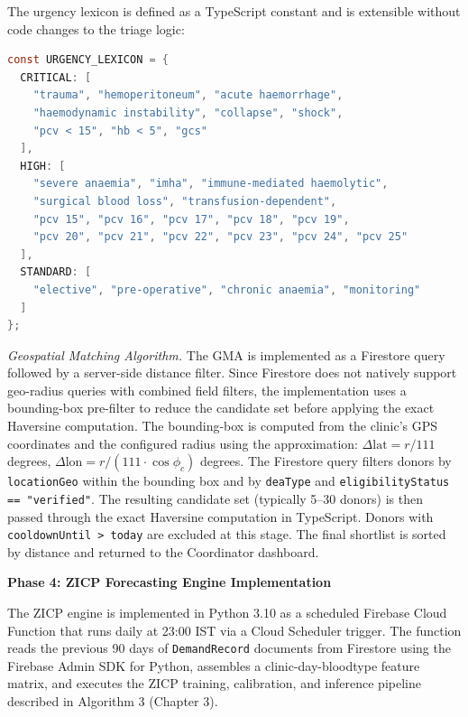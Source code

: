 \documentclass[12pt,a4paper]{article}
\begin{document}
\noindent The urgency lexicon is defined as a TypeScript constant and is extensible without code changes to the triage logic:

\begin{lstlisting}[language=Java, caption={NLP urgency lexicon (excerpt)}]
const URGENCY_LEXICON = {
  CRITICAL: [
    "trauma", "hemoperitoneum", "acute haemorrhage",
    "haemodynamic instability", "collapse", "shock",
    "pcv < 15", "hb < 5", "gcs"
  ],
  HIGH: [
    "severe anaemia", "imha", "immune-mediated haemolytic",
    "surgical blood loss", "transfusion-dependent",
    "pcv 15", "pcv 16", "pcv 17", "pcv 18", "pcv 19",
    "pcv 20", "pcv 21", "pcv 22", "pcv 23", "pcv 24", "pcv 25"
  ],
  STANDARD: [
    "elective", "pre-operative", "chronic anaemia", "monitoring"
  ]
};
\end{lstlisting}

\noindent\textit{Geospatial Matching Algorithm.} The GMA is implemented as a Firestore query followed by a server-side distance filter. Since Firestore does not natively support geo-radius queries with combined field filters, the implementation uses a bounding-box pre-filter to reduce the candidate set before applying the exact Haversine computation. The bounding-box is computed from the clinic's GPS coordinates and the configured radius using the approximation: $\Delta\text{lat} = r / 111$ degrees, $\Delta\text{lon} = r / (111 \cdot \cos\phi_c)$ degrees. The Firestore query filters donors by \texttt{locationGeo} within the bounding box and by \texttt{deaType} and \texttt{eligibilityStatus == "verified"}. The resulting candidate set (typically 5--30 donors) is then passed through the exact Haversine computation in TypeScript. Donors with \texttt{cooldownUntil > today} are excluded at this stage. The final shortlist is sorted by distance and returned to the Coordinator dashboard.

\vspace{1.2em}
\noindent\textbf{Phase 4: ZICP Forecasting Engine Implementation}
\vspace{0.5em}

\noindent The ZICP engine is implemented in Python 3.10 as a scheduled Firebase Cloud Function that runs daily at 23:00 IST via a Cloud Scheduler trigger. The function reads the previous 90 days of \texttt{DemandRecord} documents from Firestore using the Firebase Admin SDK for Python, assembles a clinic-day-bloodtype feature matrix, and executes the ZICP training, calibration, and inference pipeline described in Algorithm 3 (Chapter 3).
\end{document}
